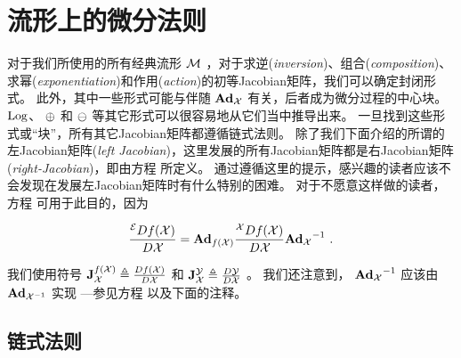 
\section{流形上的微分法则}
\label{sec:derivatives_M}

对于我们所使用的所有经典流形 $\cM$ ，对于求逆(\emph{inversion})、组合(\emph{composition})、求幂(\emph{exponentiation})和作用(\emph{action})的初等Jacobian矩阵，我们可以确定封闭形式。
此外，其中一些形式可能与伴随 $\Ad[\cM]{\cX}$ 有关，后者成为微分过程的中心块。
$\Log$、 $\op$ 和 $\om$ 等其它形式可以很容易地从它们当中推导出来。
一旦找到这些形式或“块”，所有其它Jacobian矩阵都遵循链式法则。
除了我们下面介绍的所谓的左Jacobian矩阵(\emph{left Jacobian})，这里发展的所有Jacobian矩阵都是右Jacobian矩阵(\emph{right-Jacobian})，即由方程  所定义。
通过遵循这里的提示，感兴趣的读者应该不会发现在发展左Jacobian矩阵时有什么特别的困难。
对于不愿意这样做的读者，方程  可用于此目的，因为


%
\begin{align}
\ldpar{f(\cX)}{\cX} = \Ad[\cN]{f(\cX)}\rdpar{f(\cX)}{\cX} \Ad[\cM]{\cX}\inv
~.
\end{align}


我们使用符号 $\mjac{f(\cX)}{\cX}\te\ndpar{f(\cX)}{\cX}$ 和 $\mjac{\cY}{\cX}\te\ndpar{\cY}{\cX}$ 。
我们还注意到， $\Ad[\cM]{\cX}\inv$ 应该由 $\Ad[\cM]{\cX\inv}$ 实现 ---参见方程  以及下面的注释。



\subsection{链式法则}
\label{sec:jacs_chain_rule}

